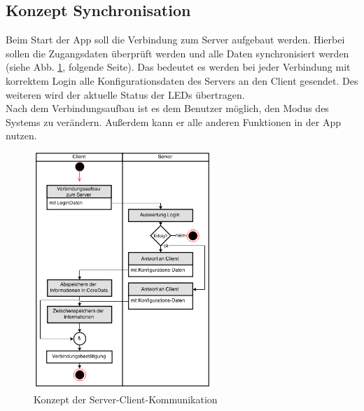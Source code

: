 \subsection{Konzept Synchronisation}
Beim Start der App soll die Verbindung zum Server aufgebaut werden. Hierbei sollen die Zugangsdaten überprüft werden und alle Daten synchronisiert werden (siehe Abb. \ref{fig:server-client}, folgende Seite). Das bedeutet es werden bei jeder Verbindung mit korrektem Login alle Konfigurationsdaten des Servers an den Client gesendet. Des weiteren wird der aktuelle Status der LEDs übertragen. \\
Nach dem Verbindungsaufbau ist es dem Benutzer möglich, den Modus des Systems zu verändern. Außerdem kann er alle anderen Funktionen in der App nutzen.

\begin{figure}[h]
	\begin{minipage}{\textwidth}
		\centering
		\includegraphics[width=0.6\textwidth]{./data/konzept.png}
		\caption{\label{fig:server-client}Konzept der Server-Client-Kommunikation}
	\end{minipage}
\end{figure}

